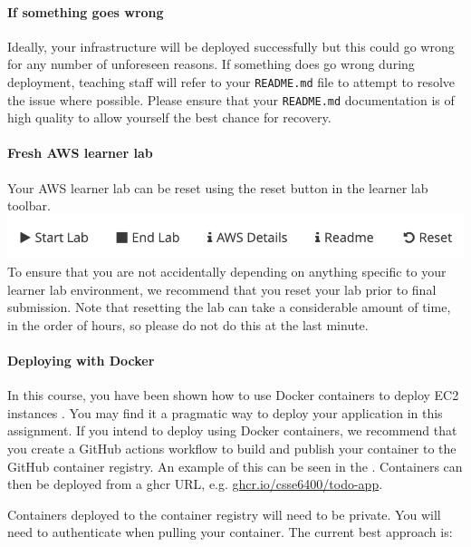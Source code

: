 \documentclass{csse4400}
\begin{document}
\paragraph{If something goes wrong}
Ideally, your infrastructure will be deployed successfully but this could go wrong for any number of unforeseen reasons.
If something does go wrong during deployment,
teaching staff will refer to your \texttt{README.md} file to attempt to resolve the issue where possible.
Please ensure that your \texttt{README.md} documentation is of high quality to allow yourself the best chance for recovery.

\paragraph{Fresh AWS learner lab}
Your AWS learner lab can be reset using the reset button in the learner lab toolbar.
\includegraphics[width=\textwidth]{images/reset-button.png}
To ensure that you are not accidentally depending on anything specific to your learner lab environment,
we recommend that you reset your lab prior to final submission.
Note that resetting the lab can take a considerable amount of time,
in the order of hours,
so please do not do this at the last minute.

\paragraph{Deploying with Docker}
In this course,
you have been shown how to use Docker containers to deploy EC2 instances \cite{prac-week5}.
You may find it a pragmatic way to deploy your application in this assignment.
If you intend to deploy using Docker containers,
we recommend that you create a GitHub actions workflow
to build and publish your container to the GitHub container registry.
An example of this can be seen in the .
Containers can then be deployed from a ghcr URL, e.g. \url{ghcr.io/csse6400/todo-app}.

Containers deployed to the container registry will need to be private.
You will need to authenticate when pulling your container.
The current best approach is:
\end{document}
